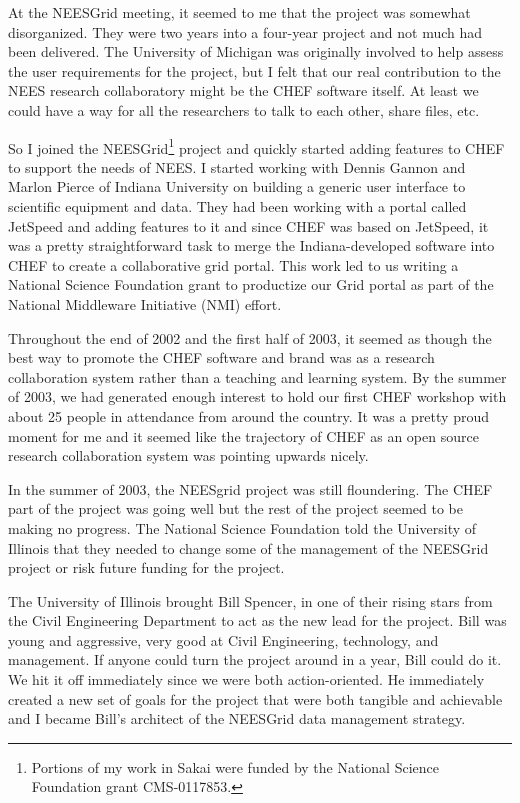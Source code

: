 \documentclass[12pt]{book}
\begin{document}
At the NEESGrid meeting, it seemed to me that the project was somewhat
disorganized.  They were two years into a four-year project and
not much had been delivered.  The University of Michigan
was originally involved to help assess the user requirements for the
project, but I felt that our real contribution to the NEES research
collaboratory might be the CHEF software itself.  At least we could
have a way for all the researchers to talk to
each other, share files, etc.

So I joined the NEESGrid\footnote{Portions of
my work in Sakai were funded by the National Science
Foundation grant CMS-0117853.} project and quickly started adding features
to CHEF to support the needs of NEES.  I started working with
Dennis Gannon and Marlon Pierce of Indiana University on building a generic
user interface to scientific equipment and data.  They had been
working with a portal called JetSpeed and adding features to it
and since CHEF was based on JetSpeed, it was a pretty straightforward
task to merge the Indiana-developed software into CHEF to
create a collaborative grid portal.  This work led to us writing
a National Science Foundation grant to productize our Grid portal
as part of the National Middleware Initiative (NMI) effort.

Throughout the end of 2002 and the first half of 2003, it seemed
as though the best way to promote the CHEF software and brand
was as a research collaboration system rather than a teaching
and learning system.  By the summer of 2003, we had generated enough
interest to hold our first CHEF workshop with about 25 people
in attendance from around the country.  It was a pretty proud
moment for me and it seemed like the trajectory of CHEF
as an open source research collaboration system was pointing
upwards nicely.

In the summer of 2003, the NEESgrid project was
still floundering.  The CHEF part of the project was going well
but the rest of the project seemed to be making no progress.
The National Science Foundation told the University of Illinois
that they needed to change some of the management of the
NEESGrid project or risk future funding for the project.

The University of Illinois brought Bill Spencer, in one of their rising
stars from the Civil Engineering Department to act as the
new lead for the project.  Bill was young and
aggressive, very good at Civil Engineering,
technology, and management.  If anyone could turn the project
around in a year, Bill could do it.  We hit
it off immediately since we were both action-oriented.
He immediately created a new set of goals
for the project that were both tangible and achievable and
I became Bill's architect of the
NEESGrid data management strategy.
\end{document}
